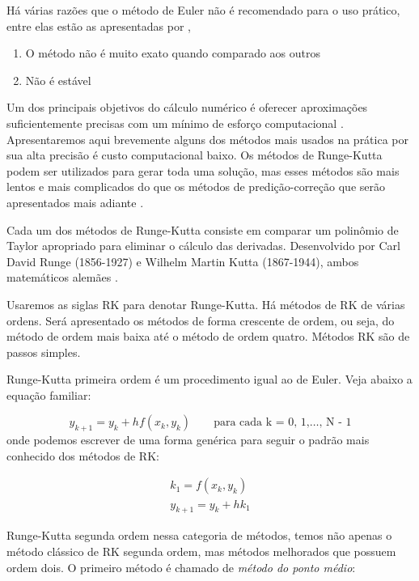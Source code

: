 Há várias razões que o método de Euler não é recomendado para
o uso prático, entre elas estão as apresentadas por ,

\begin{enumerate}[label=\roman*.]
\item O método não é muito exato quando comparado aos outros
\item Não é estável
\end{enumerate}

Um dos principais objetivos do cálculo numérico é oferecer aproximações
suficientemente precisas com um mínimo de esforço computacional \cite{faires}.
Apresentaremos aqui brevemente alguns dos métodos mais usados na prática
por sua alta precisão é custo computacional baixo. Os métodos de Runge-Kutta
podem ser utilizados para gerar toda uma solução, mas esses métodos são mais lentos
e mais complicados do que os métodos de predição-correção que serão apresentados mais
adiante \cite{bronson}.

Cada um dos métodos de Runge-Kutta consiste em comparar um polinômio de
Taylor apropriado para eliminar o cálculo das derivadas. Desenvolvido por
Carl David Runge (1856-1927) e Wilhelm Martin Kutta (1867-1944), ambos matemáticos
alemães \cite{valle}.

Usaremos as siglas RK para denotar Runge-Kutta. Há métodos de RK  de várias ordens.
Será apresentado os métodos de forma crescente de ordem, ou seja, do método de ordem
mais baixa até o método de ordem quatro. Métodos RK são de passos simples.

Runge-Kutta primeira ordem é um procedimento igual ao de Euler.
Veja abaixo a equação familiar:

\begin{equation*}
y_{k+1} = y_{k} + hf(x_{k},y_{k})
\qquad \text{para cada k = 0, 1,$\dotsc$, N - 1}
\end{equation*}
onde podemos escrever de uma forma genérica para seguir o padrão mais conhecido
dos métodos de RK:

\begin{equation*}
\begin{split}
k_{1} = f(x_{k},y_{k})\\
y_{k+1} = y_{k} + hk_{1}
\end{split}
\end{equation*}

Runge-Kutta segunda ordem nessa categoria de métodos, temos não apenas
o método clássico de RK segunda ordem, mas métodos melhorados que possuem ordem
dois. O primeiro método é chamado de \emph{método do ponto médio}:

